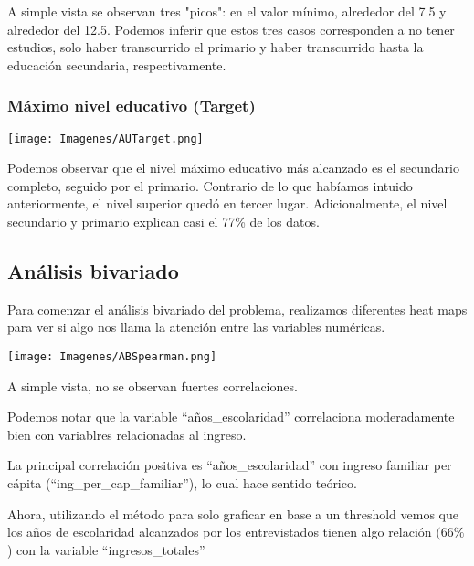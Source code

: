 \documentclass[a4paper]{article}
\begin{document}
            A simple vista se observan tres "picos": en el valor mínimo, alrededor del 7.5 y alrededor del 12.5. Podemos inferir que estos tres casos corresponden a no tener estudios, solo haber transcurrido el primario y haber transcurrido hasta la educación secundaria, respectivamente.
           
            \subsubsection{Máximo nivel educativo (Target)}
           
            \begin{center}
                \texttt{[image: Imagenes/AUTarget.png]}    
            \end{center}
           
            Podemos observar que el nivel máximo educativo más alcanzado es el secundario completo, seguido por el primario. Contrario de lo que habíamos intuido anteriormente, el nivel superior quedó en tercer lugar. Adicionalmente, el nivel secundario y primario explican casi el 77\% de los datos.

    
    \newpage
    
    \subsection{Análisis bivariado}
 
        Para comenzar el análisis bivariado del problema, realizamos diferentes heat maps para ver si algo nos llama la atención entre las variables numéricas.        
       
        \begin{center}
            \texttt{[image: Imagenes/ABSpearman.png]}
        \end{center}
 
        A simple vista, no se observan fuertes correlaciones.
 
        Podemos notar que la variable ``años\_escolaridad'' correlaciona moderadamente bien con variablres relacionadas al ingreso.
 
        La principal correlación positiva es ``años\_escolaridad'' con ingreso familiar per cápita (``ing\_per\_cap\_familiar''), lo cual hace sentido teórico.
 
        Ahora, utilizando el método para solo graficar en base a un threshold vemos que los años de escolaridad alcanzados por los entrevistados tienen algo relación $(66\%$) con la variable ``ingresos\_totales''
\end{document}
